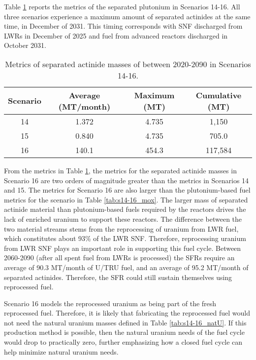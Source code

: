 Table \ref{tab:s14-16_sep_pu} reports the metrics of the separated 
plutonium in Scenarios 14-16. All three scenarios experience a 
maximum amount of separated actinides at the same time, in 
December of 2031. This timing corresponds with \gls{SNF} discharged 
from \glspl{LWR} in December of 2025 and fuel from advanced reactors
discharged in October 2031. 

\begin{table}[h!]
    \centering 
    \caption{Metrics of separated actinide masses of between 2020-2090 in 
    Scenarios 14-16.}
    \label{tab:s14-16_sep_pu}
    \begin{tabular}{c c c c}
        \hline 
        Scenario & Average (MT/month) & Maximum (MT) & Cumulative (MT) \\
        \hline
        14 & 1.372 & 4.735 & 1,150\\
        15 & 0.840 & 4.735 & 705.0\\
        16 & 140.1 & 454.3 & 117,584\\
        \hline
    \end{tabular}
\end{table}

From the metrics in Table \ref{tab:s14-16_sep_pu}, the metrics for 
the separated actinide masses in Scenario 16 are two orders of 
magnitude greater than the metrics in Scenarios 14 and 15. The metrics 
for Scenario 16 are also larger than the plutonium-based fuel metrics 
for the scenario in Table \ref{tab:s14-16_mox}. The larger mass 
of separated actinide material than plutonium-based fuels required by 
the reactors drives the lack of enriched uranium to support these 
reactors. The difference between the two material streams stems 
from the reprocessing of uranium from \gls{LWR} fuel, which constitutes 
about 93\% of the \gls{LWR} \gls{SNF}. Therefore, reprocessing 
uranium from \gls{LWR} \gls{SNF} plays an important role in supporting 
this fuel cycle. Between 2060-2090 (after all spent fuel from 
\glspl{LWR} is processed) the \glspl{SFR} require an 
average of 90.3 MT/month of U/TRU fuel, and an average of 95.2 
MT/month of separated actinides. Therefore, the \gls{SFR} could 
still sustain themselves using reprocessed fuel.

Scenario 16 models the reprocessed uranium as being part of 
the fresh reprocessed fuel. Therefore, it is likely that 
fabricating the reprocessed fuel would not need the natural
uranium masses defined in Table \ref{tab:s14-16_natU}. If this 
production method is possible, then the natural uranium needs 
of the fuel cycle would drop to practically zero, further 
emphasizing how a closed fuel cycle can help minimize
natural uranium needs. 

